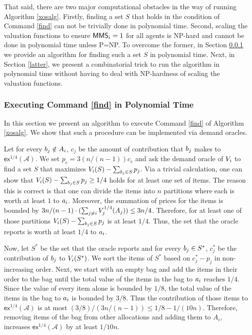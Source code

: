 That said, there are two major computational obstacles in the way of running Algorithm \ref{xosalg}. Firstly, finding a set $S$ that holds in the condition of Command \ref{find} can not be trivially done in polynomial time. Second, scaling the valuation functions to ensure $\mathsf{MMS}_i = 1$ for all agents is NP-hard and cannot be done in polynomial time unless P=NP. To overcome the former, in Section \ref{former} we provide an algorithm for finding such a set $S$ in polynomial time. Next, in Section \ref{latter}, we present a combinatorial trick to run the algorithm in polynomial time without having to deal with NP-hardness of scaling the valuation functions.

\subsubsection{Executing Command \ref{find} in Polynomial Time}\label{former}
In this section we present an algorithm to execute Command \ref{find} of Algorithm \ref{xosalg}. We show that such a procedure can be implemented via demand oracles.

Let for every $b_j \notin A_i$, $c_j$ be the amount of contribution that $b_j$ makes to $\mathsf{ex}^{1/4}(\mathcal{A})$. We set $p_e = 3(n/(n-1))c_e$ and ask the demand oracle of $V_i$ to find a set $S$ that maximizes $V_i(S) - \sum_{b_j \in S} p_j$. Via a trivial calculation, one can show that $V_i(S) - \sum_{b_j \in S} p_j \geq 1/4$ holds for at least one set of items. The reason this is correct is that one can divide the items into $n$ partitions where each is worth at least $1$ to $a_i$. Moreover, the summation of prices for the items is bounded by $3n/(n-1)\cdot (\sum_{j\neq i} V_j^{1/4} (A_j) )\leq 3n/4$. Therefore, for at least one of those partitions  $V_i(S) - \sum_{b_j \in S} p_j$ is at least $1/4$. Thus, the set that the oracle reports is worth at least $1/4$ to $a_i$. 

Now, let $S^*$ be the set that the oracle reports and for every $b_j \in S^*$, $c^*_j$ be the contribution of $b_j$ to $V_i(S^*)$. We sort the items of $S^*$ based on $c^*_j - p_j$ in non-increasing order. Next, we start with an empty bag and add the items in their order to the bag until the total value of the items in the bag to $a_i$ reaches $1/4$. Since the value of every item alone is bounded by $1/8$, the total value of the items in the bag to $a_i$ is bounded by $3/8$. Thus the contribution of those items to $\mathsf{ex}^{1/4}(\mathcal{A})$ is at most $(3/8) / (3n/(n-1)) \leq 1/8 - 1/(10n)$. Therefore, removing items of the bag from other allocations and adding them to $A_i$, increases $\mathsf{ex}^{1/4}(\mathcal{A})$ by at least $1/10n$.

